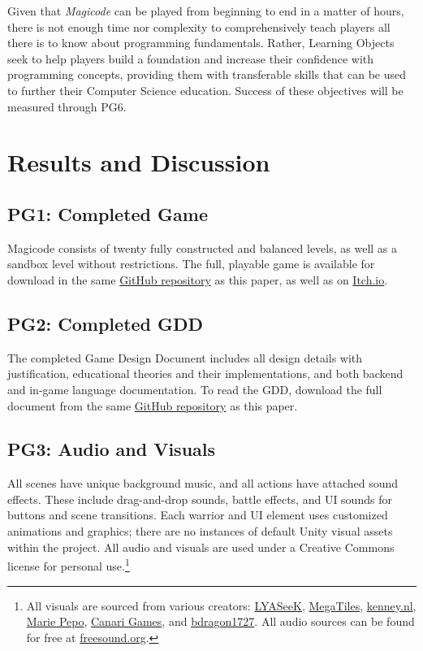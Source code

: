 \documentclass[10pt,twocolumn]{article}
\begin{document}
Given that \textit{Magicode} can be played from beginning to end in a matter of hours, there is not enough time nor complexity to comprehensively teach players all there is to know about programming fundamentals. Rather, Learning Objects seek to help players build a foundation and increase their confidence with programming concepts, providing them with transferable skills that can be used to further their Computer Science education. Success of these objectives will be measured through PG6.


\section{Results and Discussion}

\subsection{PG1: Completed Game}
Magicode consists of twenty fully constructed and balanced levels, as well as a sandbox level without restrictions. The full, playable game is available for download in the same \href{https://github.com/slevy14/Comps-Game}{GitHub repository} as this paper, as well as on \href{https://leafguy.itch.io/magicode}{Itch.io}.

\subsection{PG2: Completed GDD}
The completed Game Design Document includes all design details with justification, educational theories and their implementations, and both backend and in-game language documentation. To read the GDD, download the full document from the same \href{https://github.com/slevy14/Comps-Game}{GitHub repository} as this paper.

\subsection{PG3: Audio and Visuals}
All scenes have unique background music, and all actions have attached sound effects. These include drag-and-drop sounds, battle effects, and UI sounds for buttons and scene transitions. Each warrior and UI element uses customized animations and graphics; there are no instances of default Unity visual assets within the project. All audio and visuals are used under a Creative Commons license for personal use.\footnote{All visuals are sourced from various creators: \href{https://lyaseek.itch.io/}{LYASeeK}, \href{https://megatiles.itch.io/}{MegaTiles}, \href{http://kenney.nl}{kenney.nl}, \href{https://marie-pepo.itch.io/mf-items}{Marie Pepo}, \href{https://canarigames.itch.io/canaripack-8bit-topdown}{Canari Games}, and \href{https://bdragon1727.itch.io/basic-pixel-health-bar-and-scroll-bar}{bdragon1727}. All audio sources can be found for free at \href{https://freesound.org/}{freesound.org}.}
\end{document}
